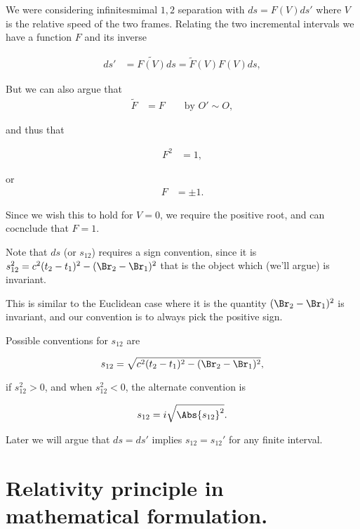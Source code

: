 We were considering infinitesmimal $1,2$ separation with $ds = F(V) ds'$ where $V$ is the relative speed of the two frames.  Relating the two incremental intervals we have a function $F$ and its inverse

\begin{align*}
ds' &= \tilde{F(V)} ds = \tilde{F}(V) F(V) ds,
\end{align*}

But we can also argue that
\begin{align*}
\tilde{F} &= F \qquad \mbox{by $O' \sim O$},
\end{align*}

and thus that 

\begin{align*}
F^2 &= 1,
\end{align*}

or
\begin{align*}
F &= \pm 1.
\end{align*}

Since we wish this to hold for $V =0$, we require the positive root, and can cocnclude that $F = 1$.

Note that $ds$ (or $s_{12}$) requires a sign convention, since it is $s_{12}^2 = c^2(t_2 - t_1)^2 - (\Br_2 - \Br_1)^2$ that is the object which (we'll argue) is invariant.

This is similar to the Euclidean case where it is the quantity $(\Br_2 - \Br_1)^2$ is invariant, and our convention is to always  pick the positive sign.

Possible conventions for $s_{12}$ are

\begin{equation}\label{eqn:relativisticElectrodynamicsL3:50}
s_{12} = \sqrt{ c^2(t_2 - t_1)^2 - (\Br_2 - \Br_1)^2 },
\end{equation}

if $s_{12}^2 > 0$, and when $s_{12}^2 < 0$, the alternate convention is 

\begin{equation}\label{eqn:relativisticElectrodynamicsL3:55}
s_{12} = i \sqrt{\Abs{s_{12}}^2}.
\end{equation}

Later we will argue that $ds = ds'$ implies $s_{12} = s_{12}'$ for any finite interval.

\section{Relativity principle in mathematical formulation.}

